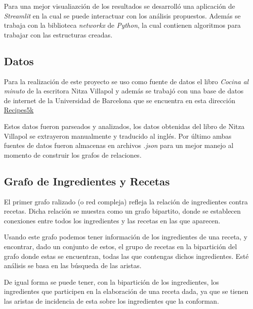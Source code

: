 \documentclass[a4paper]{article}
\begin{document}
Para una mejor visualiazción de los resultados se desarrolló una aplicación de
\emph{Streamlit} en la cual se puede interactuar con los análisis propuestos.
Además se trabaja con la biblioteca \emph{networkx} de \emph{Python}, la cual
contienen algoritmos para trabajar con las estructuras creadas.

\subsection{Datos}\label{sub:data}

Para la realización de este proyecto se uso como fuente de datos el libro
\emph{Cocina al minuto} de la escritora Nitza Villapol y además se trabajó con
una base de datos de internet de la Universidad de Barcelona que se encuentra
en esta dirección \href{http://www.ub.edu/cvub/recipes5k/}{Recipes5k}

Estos datos fueron parseados y analizados, los datos obtenidas del libro de
Nitza Villapol se extrayeron manualmente y traducido al inglés. Por último ambas
fuentes de datos fueron almacenas en archivos \emph{.json} para un mejor manejo
al momento de construir los grafos de relaciones.

\subsection{Grafo de Ingredientes y Recetas}\label{sub:ing-recip-graph}
El primer grafo ralizado (o red compleja) refleja la relación de ingredientes
contra recetas. Dicha relación se muestra como un grafo bipartito, donde se
establecen conexiones entre todos los ingredientes y las recetas en las que
aparecen.

Usando este grafo podemos tener información de los ingredientes de una receta,
y encontrar, dado un conjunto de estos, el grupo de recetas en la bipartición
del grafo donde estas se encuentran, todas las que contengas dichos ingredientes.
Esté análisis se basa en las búsqueda de las aristas.

De igual forma se puede tener, con la bipartición de los ingredientes, los
ingredientes que participen en la elaboración de una receta dada, ya que se
tienen las aristas de incidencia de esta sobre los ingredientes que la conforman.
\end{document}
